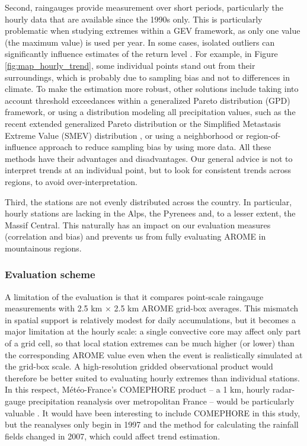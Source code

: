 \documentclass[hess, manuscript]{copernicus}
\begin{document}
Second, raingauges provide measurement over short periods, particularly the hourly data that are available since the 1990s only. This is particularly problematic when studying extremes within a GEV framework, as only one value (the maximum value) is used per year. In some cases, isolated outliers can significantly influence estimates of the return level \citep{Zeder2024}. 
For example, in Figure \ref{fig:map_hourly_trend}, some individual points stand out from their surroundings, which is probably due to sampling bias and not to differences in climate. To make the estimation more robust, other solutions include taking into account threshold exceedances within a generalized Pareto distribution (GPD) framework, or using a distribution modeling all precipitation values, such as the recent extended generalized Pareto distribution \citep{haruna-etal-2025} or the Simplified Metastasis Extreme Value (SMEV) distribution \citep{marra2020, correa2025, lompi2025}, or using a neighborhood or region-of-influence approach \citep{blanchet2021explaining} to reduce sampling bias by using more data.
All these methods have their advantages and disadvantages. Our general advice is not to interpret trends at an individual point, but to look for consistent trends across regions, to avoid over-interpretation.

Third, the stations are not evenly distributed across the country. In particular, hourly stations are lacking in the Alps, the Pyrenees and, to a lesser extent, the Massif Central. This naturally has an impact on our evaluation measures (correlation and bias) and prevents us from fully evaluating AROME in mountainous regions.

\subsubsection{Evaluation scheme}

A limitation of the evaluation is that it compares point-scale raingauge measurements with 2.5 km $\times$ 2.5 km AROME grid-box averages. This mismatch in spatial support is relatively modest for daily accumulations, but it becomes a major limitation at the hourly scale: a single convective core may affect only part of a grid cell, so that local station extremes can be much higher (or lower) than the corresponding AROME value even when the event is realistically simulated at the grid-box scale. A high-resolution gridded observational product would therefore be better suited to evaluating hourly extremes than individual stations. In this respect, Météo-France’s COMEPHORE product -- a 1 km, hourly radar-gauge precipitation reanalysis over metropolitan France -- would be particularly valuable \citep{MeteoFrance_COMEPHORE_dataGouv}. It would have been interesting to include COMEPHORE in this study, but the reanalyses only begin in 1997 and the method for calculating the rainfall fields changed in 2007, which could affect trend estimation.
\end{document}
